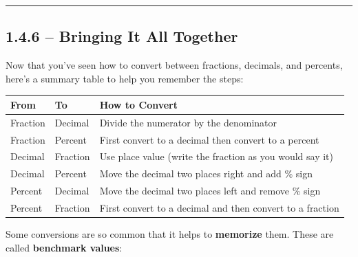 \documentclass[
  letterpaper,
  DIV=11,
  numbers=noendperiod]{scrreprt}
\begin{document}
\begin{center}\rule{0.5\linewidth}{0.5pt}\end{center}

\subsection*{1.4.6 -- Bringing It All
Together}\label{bringing-it-all-together}

Now that you've seen how to convert between fractions, decimals, and
percents, here's a summary table to help you remember the steps:

\begin{longtable}[]{@{}
  >{\raggedright\arraybackslash}p{}
  >{\raggedright\arraybackslash}p{}
  >{\raggedright\arraybackslash}p{}@{}}
\toprule\noalign{}
\begin{minipage}[b]{\linewidth}\raggedright
From
\end{minipage} & \begin{minipage}[b]{\linewidth}\raggedright
To
\end{minipage} & \begin{minipage}[b]{\linewidth}\raggedright
How to Convert
\end{minipage} \\
\midrule\noalign{}
\endhead
\bottomrule\noalign{}
\endlastfoot
Fraction & Decimal & Divide the numerator by the denominator \\
Fraction & Percent & First convert to a decimal then convert to a
percent \\
Decimal & Fraction & Use place value (write the fraction as you would
say it) \\
Decimal & Percent & Move the decimal two places right and add \% sign \\
Percent & Decimal & Move the decimal two places left and remove \%
sign \\
Percent & Fraction & First convert to a decimal and then convert to a
fraction \\
\end{longtable}

Some conversions are so common that it helps to \textbf{memorize} them.
These are called \textbf{benchmark values}:
\end{document}

